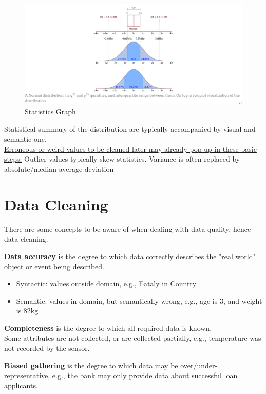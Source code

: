 \begin{figure}[htbp]
   \centering
   \includegraphics{images/01/statisticsgraph.png}
   \caption{Statistics Graph}
   \label{fig:01/statistics}
\end{figure}

Statistical summary of the distribution are typically accompanied by visual and semantic one.\\
\ul{Erroneous or weird values to be cleaned later may already pop up in these basic steps.}
Outlier values typically skew statistics. Variance is often replaced by absolute/median average deviation

\section{Data Cleaning}

There are some concepts to be aware of when dealing with data quality, hence data cleaning.
\nl

\textbf{Data accuracy} is the degree to which data correctly describes the "real world" object or event being
described.
\begin{itemize}
	\item Syntactic: values outside domain, e.g., Eataly in Country
	\item Semantic: values in domain, but semantically wrong, e.g., age is 3, and weight is 82kg
\end{itemize}

\textbf{Completeness} is the degree to which all required data is known.\\
Some attributes are not collected, or are collected partially, e.g., temperature was not
recorded by the sensor.

\textbf{Biased gathering} is the degree to which data may be over/under-representative, e.g., the bank may only provide data about successful loan applicants.

